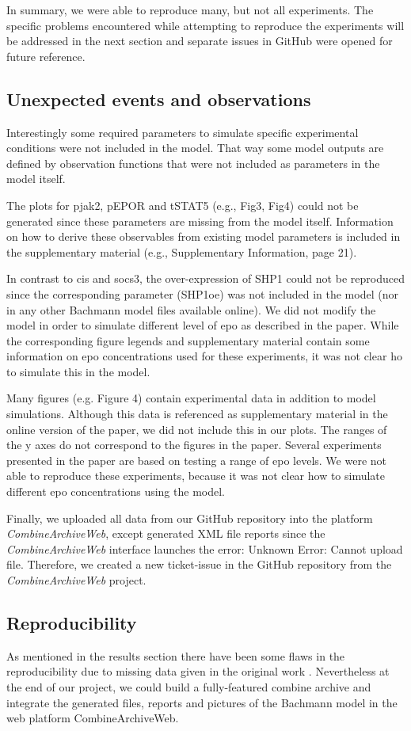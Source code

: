In summary, we were able to reproduce many, but not all experiments. The specific problems encountered while attempting to reproduce the experiments will be addressed in the next section and separate issues in GitHub were opened for future reference.


\subsection*{Unexpected events and observations}
Interestingly some required parameters to simulate specific experimental conditions were not included in the model. That way some model outputs are defined by observation functions that were not included as parameters in the model itself. 

The plots for p\ac{jak}2, pEPOR and tSTAT5 (e.g., Fig3, Fig4) could not be generated since these parameters are missing from the model itself. Information on how to derive these observables from existing model parameters is included in the supplementary material (e.g., Supplementary Information, page 21). 

In contrast to \ac{cis} and \ac{socs}3, the over-expression of SHP1 could not be reproduced since the corresponding parameter (SHP1oe) was not included in the model (nor in any other Bachmann model files available online). We did not modify the model in order to simulate different level of \ac{epo} as described in the paper. While the corresponding figure legends and supplementary material contain some information on \ac{epo} concentrations used for these experiments, it was not clear ho to simulate this in the model.

Many figures (e.g. Figure 4) contain experimental data in addition to model simulations. Although this data is referenced as supplementary material in the online version of the paper, we did not include this in our plots. The ranges of the y axes do not correspond to the figures in the paper. 
Several experiments presented in the paper are based on testing a range of \ac{epo} levels. We were not able to reproduce these experiments, because it was not clear how to simulate different \ac{epo} concentrations using the model.

Finally, we uploaded all data from our GitHub repository into the platform \textit{CombineArchiveWeb}, except generated XML file reports since the \textit{CombineArchiveWeb} interface launches the error: \textsf{Unknown Error: Cannot upload file}. Therefore, we created a new ticket-issue in the GitHub repository from the \textit{CombineArchiveWeb} project.

\subsection*{Reproducibility}
As mentioned in the results section there have been some flaws in the reproducibility due to missing data given in the original work \cite{bachmannmodel}. Nevertheless at the end of our project, we could build a fully-featured \ac{combine} archive and integrate the generated files, reports and pictures of the Bachmann model in the web platform CombineArchiveWeb.
